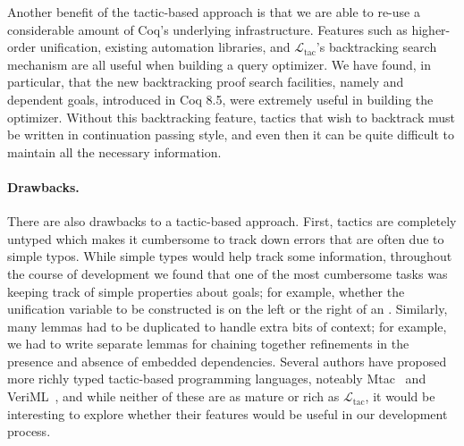 \documentclass[preprint]{sigplanconf}
\newcommand{\ltac}[0]{\ensuremath{\mathcal{L}_{\mathrm{tac}}}}
\begin{document}
Another benefit of the tactic-based approach is that we are able to re-use a considerable amount of Coq's underlying infrastructure.
Features such as higher-order unification, existing automation libraries, and \ltac's backtracking search mechanism are all useful when building a query optimizer.
We have found, in particular, that the new backtracking proof search facilities, namely \coqe{+} and dependent goals, introduced in Coq 8.5, were extremely useful in building the optimizer.
Without this backtracking feature, tactics that wish to backtrack must be written in continuation passing style, and even then it can be quite difficult to maintain all the necessary information.

\paragraph{Drawbacks.}
There are also drawbacks to a tactic-based approach.
First, tactics are completely untyped which makes it cumbersome to track down errors that are often due to simple typos.
While simple types would help track some information, throughout the course of development we found that one of the most cumbersome tasks was keeping track of simple properties about goals; for example, whether the unification variable to be constructed is on the left or the right of an .
Similarly, many lemmas had to be duplicated to handle extra bits of context; for example, we had to write separate lemmas for chaining together refinements in the presence and absence of embedded dependencies.
Several authors have proposed more richly typed tactic-based programming languages, noteably Mtac~\cite{ziliani2013mtac} and VeriML~\cite{stampoulis2010veriml}, and while neither of these are as mature or rich as \ltac, it would be interesting to explore whether their features would be useful in our development process.
\end{document}
